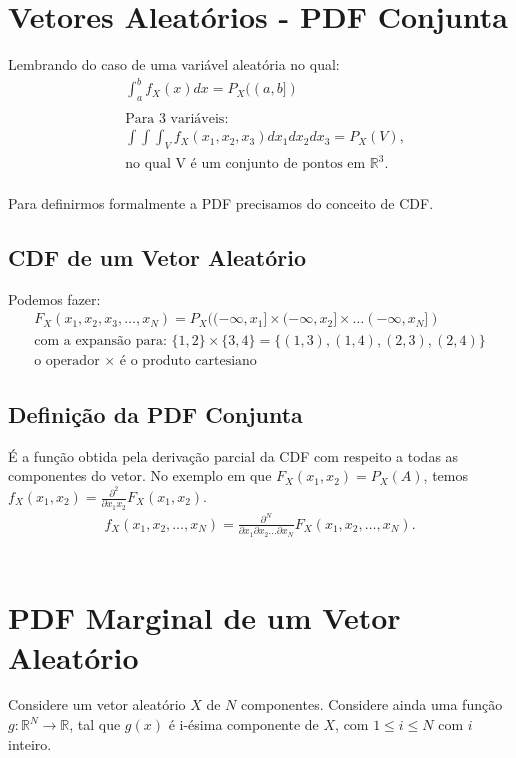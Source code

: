 \documentclass{article}
\begin{document}
\setlength{\abovedisplayskip}{12pt}
\setlength{\belowdisplayskip}{12pt}
\setlength{\abovedisplayshortskip}{0pt}
\setlength{\belowdisplayshortskip}{0pt}
\setlength{\jot}{1pt}

\section{Vetores Aleatórios - PDF Conjunta}
Lembrando do caso de uma variável aleatória no qual:
\begin{align*}
    &\int^{b}_{a} f_X(x)dx = P_X((a,b]) \\ \\
    &\text{Para 3 variáveis:} \\
    &\int \int \int_{V} f_X(x_1,x_2,x_3) d x_1 d x_2 d x_3 = P_X(V), \\
    &\text{no qual V é um conjunto de pontos em } \mathbb{R}^3
.\end{align*}
\\[0.5em]
Para definirmos formalmente a PDF precisamos do conceito de CDF.

\subsection{CDF de um Vetor Aleatório}
Podemos fazer:
\begin{align*}
    F_X(x_1,x_2,x_3,\ldots,x_N) = P_X((-\infty,x_1] \times (-\infty,x_2] \times \ldots
    (-\infty,x_N]) \\
    \text{com a expansão para: } \{1,2\} \times \{3,4\} = \{(1,3), (1,4), (2,3), (2,4)\} \\
    \text{o operador $\times$ é o produto cartesiano}
\end{align*}

\subsection{Definição da PDF Conjunta}
É a função obtida pela derivação parcial da CDF com respeito a todas as componentes do vetor. No
exemplo em que $F_X(x_1,x_2)=P_X(A)$, temos $f_X(x_1,x_2) = \frac{\partial^{2}}{\partial x_1
x_2}F_X(x_1,x_2)$.
\begin{align*}
    f_X(x_1, x_2, \ldots, x_N) = \frac{\partial^{N}}{\partial x_1 \partial x_2 \ldots \partial x_N
    }F_X(x_1, x_2, \ldots, x_N)
.\end{align*}
\\
\section{PDF Marginal de um Vetor Aleatório}
Considere um vetor aleatório $X$ de $N$ componentes. Considere ainda uma função $g: \mathbb{R}^N
\to \mathbb{R}$, tal que $g(x)$ é i-ésima componente de $X$, com $1 \leq i \leq N$ com $i$
inteiro.
\end{document}
